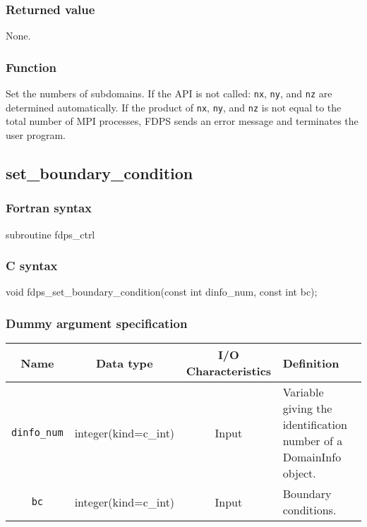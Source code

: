 \subsubsection*{Returned value}
None.


\subsubsection*{Function}
Set the numbers of subdomains. If the API is not called: \texttt{nx}, \texttt{ny}, and \texttt{nz} are determined automatically. If the product of \texttt{nx}, \texttt{ny}, and \texttt{nz} is not equal to the total number of MPI processes, FDPS sends an error message and terminates the user program.

\clearpage

\subsection{set\_boundary\_condition}
\subsubsection*{Fortran syntax}
\begin{screen}
\begin{spverbatim}
subroutine fdps_ctrl%
\end{spverbatim}
\end{screen}

\subsubsection*{C syntax}
\begin{screen}
\begin{spverbatim}
void fdps_set_boundary_condition(const int dinfo_num,
                                 const int bc);
\end{spverbatim}
\end{screen}

\subsubsection*{Dummy argument specification}
\begin{table}[h]
\begin{tabularx}{\linewidth}{cccX}
\toprule
\rowcolor{Snow2}
Name & Data type & I/O Characteristics & Definition \\
\midrule
\texttt{dinfo\_num} & integer(kind=c\_int) & Input & Variable giving the identification number of a DomainInfo object.\\
\texttt{bc} & integer(kind=c\_int) & Input & Boundary conditions. \\
\bottomrule
\end{tabularx}
\end{table}

